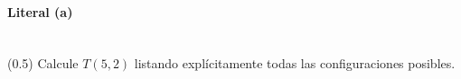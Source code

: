 \paragraph{Literal (a)}\mbox{}\\
(0.5) Calcule \(T(5,2)\) listando explícitamente todas las configuraciones posibles.